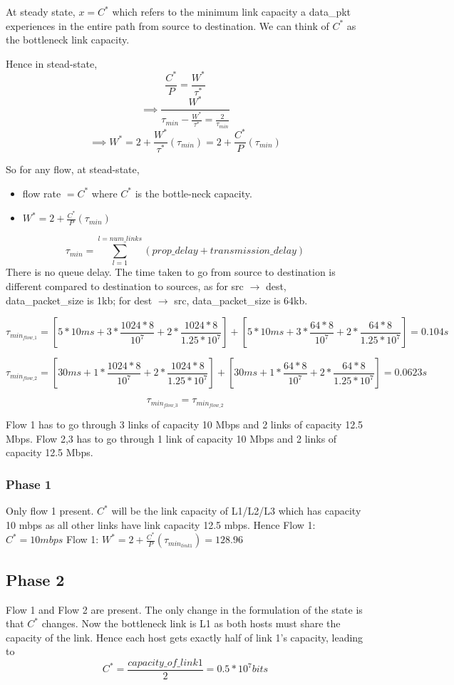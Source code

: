 \documentclass[12pt]{article}
\begin{document}
At steady state, $x=C^*$ which refers to the minimum link capacity a data\_pkt experiences in the entire path from source to destination. We can think of $C^*$ as the bottleneck link capacity.

Hence in stead-state, $$\frac{C^*}{P} = \frac{W^*}{\tau^*} $$
$$\implies \frac{W^*}{\tau_{min} - \frac{W^*}{\tau^*} = \frac{2}{\tau_{min}}}$$
$$\implies W^* = 2 + \frac{W^*}{\tau^*}(\tau_{min}) = 2 + \frac{C^*}{P}(\tau_{min}) $$

So for any flow, at stead-state, 
\begin{itemize}
\item flow rate $= C^*$ where $C^*$ is the bottle-neck capacity.
\item $W^*=2 + \frac{C^*}{P}(\tau_{min})$
\end{itemize}


$$\tau_{min}=\sum_{l=1}^{l=num\_links} (prop\_delay + transmission\_delay)$$
There is no queue delay. The time taken to go from source to destination is different compared to destination to sources, as for src $\rightarrow$ dest, data\_packet\_size is 1kb; for dest $\rightarrow$ src, data\_packet\_size is 64kb.


$$\tau_{min_{flow\_1}} = [5*10 ms + 3*\frac{1024*8}{10^7} + 2*\frac{1024*8}{1.25*10^7}] + [5*10 ms + 3*\frac{64*8}{10^7} + 2*\frac{64*8}{1.25*10^7}] = 0.104 s$$ 

$$\tau_{min_{flow\_2}} = [30 ms + 1*\frac{1024*8}{10^7} + 2*\frac{1024*8}{1.25*10^7}] + [30 ms + 1*\frac{64*8}{10^7} + 2*\frac{64*8}{1.25*10^7}] = 0.0623 s$$ 

$$\tau_{min_{flow\_3}} = \tau_{min_{flow\_2}}$$

Flow 1 has to go through 3 links of capacity 10 Mbps and 2 links of capacity 12.5 Mbps.
Flow 2,3 has to go through 1 link of capacity 10 Mbps and 2 links of capacity 12.5 Mbps.


\subsubsection*{Phase 1}
Only flow 1 present. $C^*$ will be the link capacity of L1/L2/L3 which has capacity 10 mbps as all other links have link capacity 12.5 mbps. Hence 
Flow 1: $C^* = 10 mbps$
Flow 1: $W^* = 2 + \frac{C^*}{P}(\tau_{min_{link1}})=128.96 $

\subsection*{Phase 2}
Flow 1 and Flow 2 are present. The only change in the formulation of the state is that $C^*$ changes. Now the bottleneck link is L1 as both hosts must share the capacity of the link. Hence each host gets exactly half of link 1's capacity, leading to $$ C^* = \frac{capacity\_of\_link1}{2} = 0.5*10^7 bits $$
\end{document}
